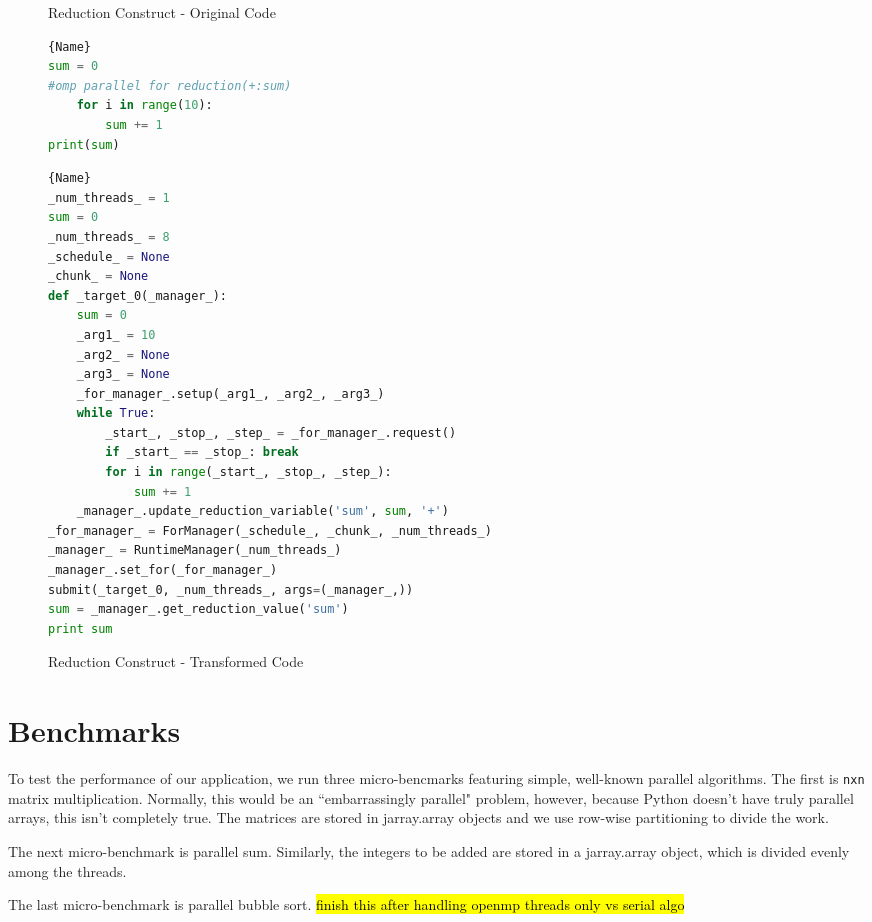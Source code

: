 \documentclass[letterpaper,12pt]{article} %
\begin{document}
\begin{figure}[H]
\caption{Reduction Construct - Original Code}
\label{fig:reduction1}
\begin{lstlisting}[language=Python]{Name}
sum = 0
#omp parallel for reduction(+:sum)
    for i in range(10):
        sum += 1
print(sum)
\end{lstlisting}

\caption{Reduction Construct - Transformed Code}
\label{fig:reduction2}
\begin{lstlisting}[language=Python]{Name}
_num_threads_ = 1
sum = 0
_num_threads_ = 8
_schedule_ = None
_chunk_ = None
def _target_0(_manager_):
    sum = 0
    _arg1_ = 10
    _arg2_ = None
    _arg3_ = None
    _for_manager_.setup(_arg1_, _arg2_, _arg3_)
    while True:
        _start_, _stop_, _step_ = _for_manager_.request()
        if _start_ == _stop_: break
        for i in range(_start_, _stop_, _step_):
            sum += 1
    _manager_.update_reduction_variable('sum', sum, '+')
_for_manager_ = ForManager(_schedule_, _chunk_, _num_threads_)
_manager_ = RuntimeManager(_num_threads_)
_manager_.set_for(_for_manager_)
submit(_target_0, _num_threads_, args=(_manager_,))
sum = _manager_.get_reduction_value('sum')
print sum
\end{lstlisting}
\end{figure}



\section{Benchmarks}
To test the performance of our application, we run three micro-bencmarks featuring simple, well-known parallel algorithms. The first is \texttt{nxn} matrix multiplication. Normally, this would be an ``embarrassingly parallel" problem, however, because Python doesn't have truly parallel arrays, this isn't completely true. The matrices are stored in jarray.array objects and we use row-wise partitioning to divide the work.

The next micro-benchmark is parallel sum. Similarly, the integers to be added are stored in a jarray.array object, which is divided evenly among the threads. 

The last micro-benchmark is parallel bubble sort. \hl{finish this after handling openmp threads only vs serial algo}
\end{document}
